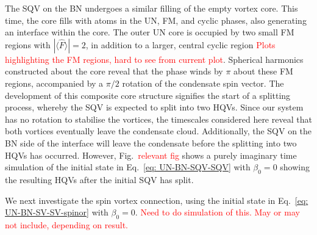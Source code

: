 The SQV on the BN undergoes a similar filling of the empty vortex core.
This time, the core fills with atoms in the UN, FM, and cyclic phases, also
generating an interface within the core.
The outer UN core is occupied by two small FM regions with
\(|\langle \hat{F} \rangle| = 2\), in addition to a larger, central cyclic
region \textcolor{red}{Plots highlighting the FM regions, hard to see from
    current plot}.
Spherical harmonics constructed about the core reveal that the phase winds by
\(\pi \) about these FM regions, accompanied by a \(\pi/2\) rotation of the
condensate spin vector.
The development of this composite core structure signifies the start of a
splitting process, whereby the SQV is expected to split into two HQVs.
Since our system has no rotation to stabilise the vortices, the timescales
considered here reveal that both vortices eventually leave the condensate
cloud.
Additionally, the SQV on the BN side of the interface will leave the condensate
before the splitting into two HQVs has occurred.
However, Fig.~\textcolor{red}{relevant fig} shows a purely imaginary time
simulation of the initial state in Eq.~\eqref{eq: UN-BN-SQV-SQV} with
\(\beta_0 = 0\) showing the resulting HQVs after the initial SQV has split.

We next investigate the spin vortex connection, using the initial state in
Eq.~\eqref{eq: UN-BN-SV-SV-spinor} with \(\beta_0=0\).
\textcolor{red}{Need to do simulation of this. May or may not include,
    depending on result.}

